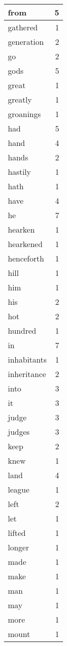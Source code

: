 \begin{center}
\begin{longtable}{l|r}
from & 5 \\ \hline
gathered & 1 \\ \hline
generation & 2 \\ \hline
go & 2 \\ \hline
gods & 5 \\ \hline
great & 1 \\ \hline
greatly & 1 \\ \hline
groanings & 1 \\ \hline
had & 5 \\ \hline
hand & 4 \\ \hline
hands & 2 \\ \hline
hastily & 1 \\ \hline
hath & 1 \\ \hline
have & 4 \\ \hline
he & 7 \\ \hline
hearken & 1 \\ \hline
hearkened & 1 \\ \hline
henceforth & 1 \\ \hline
hill & 1 \\ \hline
him & 1 \\ \hline
his & 2 \\ \hline
hot & 2 \\ \hline
hundred & 1 \\ \hline
in & 7 \\ \hline
inhabitants & 1 \\ \hline
inheritance & 2 \\ \hline
into & 3 \\ \hline
it & 3 \\ \hline
judge & 3 \\ \hline
judges & 3 \\ \hline
keep & 2 \\ \hline
knew & 1 \\ \hline
land & 4 \\ \hline
league & 1 \\ \hline
left & 2 \\ \hline
let & 1 \\ \hline
lifted & 1 \\ \hline
longer & 1 \\ \hline
made & 1 \\ \hline
make & 1 \\ \hline
man & 1 \\ \hline
may & 1 \\ \hline
more & 1 \\ \hline
mount & 1 \\ \hline

\end{longtable}
\end{center}
